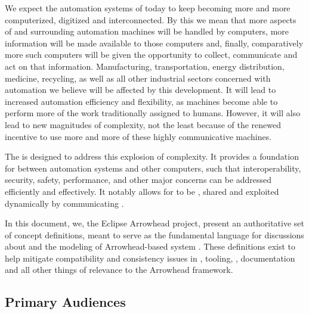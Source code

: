 %
%

We expect the automation systems of today to keep becoming more and more computerized, digitized and interconnected.
By this we mean that more aspects of and surrounding automation machines will be handled by computers, more information will be made available to those computers and, finally, comparatively more such computers will be given the opportunity to collect, communicate and act on that information.
Manufacturing, transportation, energy distribution, medicine, recycling, as well as all other industrial sectors concerned with automation we believe will be affected by this development.
It will lead to increased automation efficiency and flexibility, as machines become able to perform more of the work traditionally assigned to humans.
However, it will also lead to new magnitudes of complexity, not the least because of the renewed incentive to use more and more of these highly communicative machines.

The  is designed to address this explosion of complexity.
It provides a foundation for  \cite{mackenzie2006reference} between automation systems and other computers, such that interoperability, security, safety, performance, and other major concerns can be addressed efficiently and effectively.
It notably allows for   to be , shared and exploited dynamically by communicating .

In this document, we, the Eclipse Arrowhead project, present an authoritative set of concept definitions, meant to serve as the fundamental language for discussions about and the modeling of Arrowhead-based system .
These definitions exist to help mitigate compatibility and consistency issues in , tooling, , documentation and all other things of relevance to the Arrowhead framework.

\subsection{Primary Audiences}
\label{sec:introduction:audiences}

